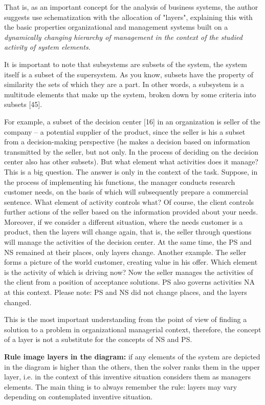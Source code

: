 That is, as an important concept for the analysis of business systems, the
author suggests use schematization with the allocation of "layers", explaining
this with the basic properties organizational and management systems built on
a \emph{dynamically changing hierarchy of management in the context of the
  studied activity of system elements.}

It is important to note that subsystems are subsets of the system, the system
itself is a subset of the supersystem. As you know, subsets have the property
of similarity the sets of which they are a part. In other words, a subsystem
is a multitude elements that make up the system, broken down by some criteria
into subsets [45].

For example, a subset of the decision center [16] in an organization is seller
of the company -- a potential supplier of the product, since the seller is his
a subset from a decision-making perspective (he makes a decision based on
information transmitted by the seller, but not only. In the process of
deciding on the decision center also has other subsets). But what element what
activities does it manage? This is a big question. The answer is only in the
context of the task.  Suppose, in the process of implementing his functions,
the manager conducts research customer needs, on the basis of which will
subsequently prepare a commercial sentence. What element of activity controls
what? Of course, the client controls further actions of the seller based on
the information provided about your needs. Moreover, if we consider a
different situation, where the needs customer is a product, then the layers
will change again, that is, the seller through questions will manage the
activities of the decision center. At the same time, the PS and NS remained at
their places, only layers change. Another example. The seller forms a picture
of the world customer, creating value in his offer. Which element is the
activity of which is driving now? Now the seller manages the activities of the
client from a position of acceptance solutions.  PS also governs activities NA
at this context.  Please note: PS and NS did not change places, and the layers
changed.

This is the most important understanding from the point of view of finding a
solution to a problem in organizational managerial context, therefore, the
concept of a layer is not a substitute for the concepts of NS and PS.

\textbf{Rule image layers in the diagram:} if any elements of the system are
depicted in the diagram is higher than the others, then the solver ranks them
in the upper layer, i.e.  in the context of this inventive situation considers
them as managers elements. The main thing is to always remember the rule:
layers may vary depending on contemplated inventive situation.

